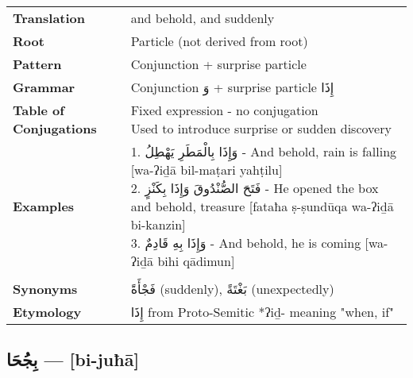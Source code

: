 \documentclass[letterpaper,12pt]{article}
\begin{document}
\begin{tabular}{p{3cm}p{10cm}}
\toprule
\textbf{Translation} & and behold, and suddenly \\
\textbf{Root} & Particle (not derived from root) \\
\textbf{Pattern} & Conjunction + surprise particle \\
\textbf{Grammar} & Conjunction \textarabic{وَ} + surprise particle \textarabic{إِذَا} \\
\textbf{Table of Conjugations} & \makecell[l]{
Fixed expression - no conjugation\\
Used to introduce surprise or sudden discovery
} \\
\textbf{Examples} & \makecell[l]{\parbox{9.5cm}{
1. \textarabic{وَإِذَا بِالْمَطَرِ يَهْطِلُ} - And behold, rain is falling [wa-ʔiḏā bil-maṭari yahṭilu]\\
2. \textarabic{فَتَحَ الصُّنْدُوقَ وَإِذَا بِكَنْزٍ} - He opened the box and behold, treasure [fataħa ṣ-ṣundūqa wa-ʔiḏā bi-kanzin]\\
3. \textarabic{وَإِذَا بِهِ قَادِمٌ} - And behold, he is coming [wa-ʔiḏā bihi qādimun]
}} \\
\midrule \\
\textbf{Synonyms} & \textarabic{فَجْأَةً} (suddenly), \textarabic{بَغْتَةً} (unexpectedly) \\
\textbf{Etymology} & \textarabic{إِذَا} from Proto-Semitic *ʔiḏ- meaning "when, if" \\
\bottomrule
\end{tabular}

\subsection{\textarabic{بِجُحَا} — [bi-juħā]}
\end{document}
